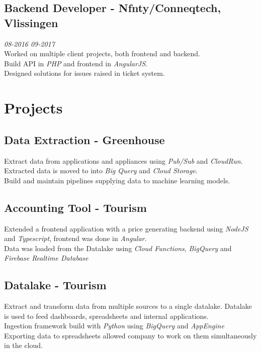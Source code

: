 \documentclass{article}
\begin{document}
\subsection{Backend Developer - Nfnty/Conneqtech, Vlissingen} \hfill {\em 08-2016 09-2017} \\
Worked on multiple client projects, both frontend and backend. \\
Build API in \emph{PHP} and frontend in \emph{AngularJS}. \\
Designed solutions for issues raised in ticket system. \\


\section{Projects}
\subsection{Data Extraction - Greenhouse}
Extract data from applications and appliances using \emph{Pub/Sub} and \emph{CloudRun}. Extracted data is moved to into \emph{Big Query} and \emph{Cloud Storage}. \\
Build and maintain pipelines supplying data to machine learning models. \\

\subsection{Accounting Tool - Tourism}
Extended a frontend application with a price generating backend using \emph{NodeJS} and \emph{Typescript}, frontend was done in \emph{Angular}. \\
Data was loaded from the Datalake using \emph{Cloud Functions}, \emph{BigQuery} and \emph{Firebase Realtime Database} \\

\subsection{Datalake - Tourism}
Extract and transform data from multiple sources to a single datalake. Datalake is used to feed dashboards, spreadsheets and internal applications. \\
Ingestion framework build with \emph{Python} using \emph{BigQuery} and \emph{AppEngine} \\
Exporting data to spreadsheets allowed company to work on them simultaneously in the cloud. \\
\end{document}
